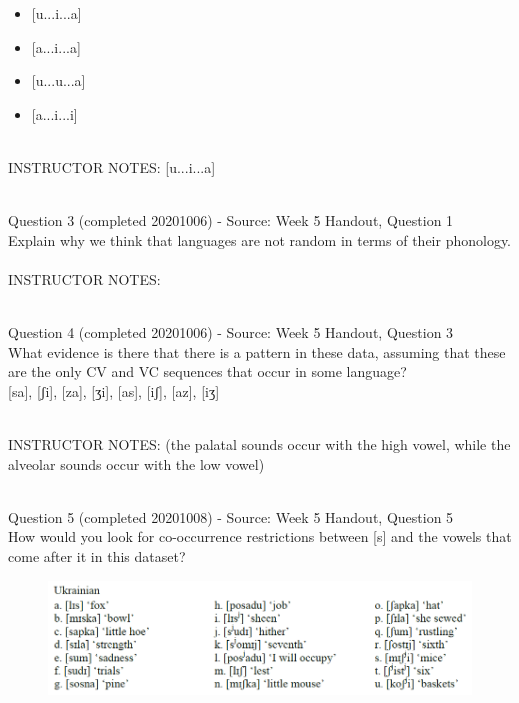 \documentclass[12pt]{article}
\begin{document}
\begin{itemize} \item {[u...i...a]} \item {[a...i...a]} \item {[u...u...a]} \item {[a...i...i]} \end{itemize}


~\\
INSTRUCTOR NOTES: [u...i...a]


~\\

{\large Question 3} (completed 20201006) - Source: Week 5 Handout, Question 1\\

Explain why we think that languages are not random in terms of their phonology.\\


~\\
INSTRUCTOR NOTES: 


~\\

{\large Question 4} (completed 20201006) - Source: Week 5 Handout, Question 3\\

What evidence is there that there is a pattern in these data, assuming that these are the only CV and VC sequences that occur in some language?\\

{[sa]}, {[ʃi]}, {[za]}, {[ʒi]}, {[as]}, {[iʃ]}, {[az]}, {[iʒ]}


~\\
INSTRUCTOR NOTES: (the palatal sounds occur with the high vowel, while the alveolar sounds occur with the low vowel)


~\\

{\large Question 5} (completed 20201008) - Source: Week 5 Handout, Question 5\\

How would you look for co-occurrence restrictions between [s] and the vowels that come after it in this dataset?\\

\begin{figure}[H]
\includegraphics{../images/ukrainian.png}
\end{figure}
\end{document}
